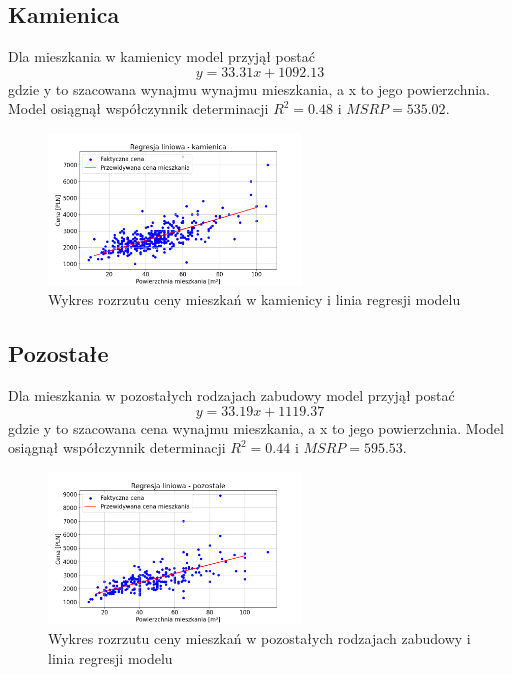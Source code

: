 \documentclass[10pt]{article}
\begin{document}
\subsection{Kamienica}
Dla mieszkania w kamienicy model przyjął postać 
\begin {equation}
y = 33.31x + 1092.13
\end{equation}
gdzie y to szacowana  wynajmu wynajmu mieszkania, a x to jego powierzchnia.
Model osiągnął współczynnik determinacji $ R^2 = 0.48 $ i $ MSRP = 535.02 $.

\begin{figure}[H]
    \centering
    \includegraphics[width=0.6\textwidth]{regression-kamienica.png}
    \caption{Wykres rozrzutu ceny mieszkań w kamienicy i linia regresji modelu}
    \label{fig:regression-kamienica}
\end{figure}


\subsection{Pozostałe}
Dla mieszkania w pozostałych rodzajach zabudowy model przyjął postać 
\begin {equation}
y = 33.19x + 1119.37
\end{equation}
gdzie y to szacowana cena wynajmu mieszkania, a x to jego powierzchnia.
Model osiągnął współczynnik determinacji $ R^2 = 0.44 $ i $ MSRP = 595.53 $.

\begin{figure}[H]
    \centering
    \includegraphics[width=0.6\textwidth]{regression-pozostale.png}
    \caption{Wykres rozrzutu ceny mieszkań w pozostałych rodzajach zabudowy i linia regresji modelu}
    \label{fig:regression-pozostale}
\end{figure}
\end{document}
